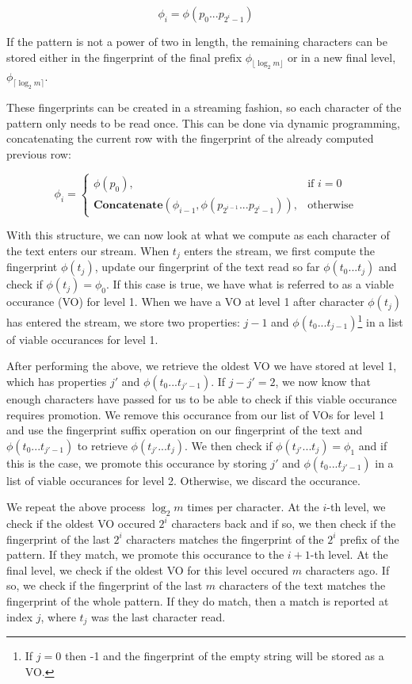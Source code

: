 \documentclass[ %
                    author={Dominic Joseph Moylett},
                supervisor={Dr. Raphael Clifford and Dr. Benjamin Sach},
                    degree={MEng},
                     title={Dictionary Matching with Fingerprints},
                  subtitle={An Empirical Analysis},
                      type={Research},
                      year={2014} ]{dissertation}
\begin{document}
$$\phi_i = \phi(p_0...p_{2^i-1})$$

If the pattern is not a power of two in length, the remaining characters can be stored either in the fingerprint of the final prefix $\phi_{\lfloor\log_2m\rfloor}$ or in a new final level, $\phi_{\lceil\log_2m\rceil}$.

These fingerprints can be created in a streaming fashion, so each character of the pattern only needs to be read once. This can be done via dynamic programming, concatenating the current row with the fingerprint of the already computed previous row:

\[
  \phi_i =
  \begin{cases}
    \phi(p_0),& \text{if } i = 0\\
    \textbf{Concatenate}(\phi_{i - 1}, \phi(p_{2^{i-1}}...p_{2^i-1})),& \text{otherwise}
  \end{cases}
\]

With this structure, we can now look at what we compute as each character of the text enters our stream. When $t_j$ enters the stream, we first compute the fingerprint $\phi(t_j)$, update our fingerprint of the text read so far $\phi(t_0...t_j)$ and check if $\phi(t_j) = \phi_0$. If this case is true, we have what is referred to as a viable occurance (VO) for level 1. When we have a VO at level 1 after character $\phi(t_j)$ has entered the stream, we store two properties: $j-1$ and $\phi(t_0...t_{j-1})$\footnote{If $j = 0$ then -1 and the fingerprint of the empty string will be stored as a VO.} in a list of viable occurances for level 1.

After performing the above, we retrieve the oldest VO we have stored at level 1, which has properties $j'$ and $\phi(t_0...t_{j'-1})$. If $j - j' = 2$, we now know that enough characters have passed for us to be able to check if this viable occurance requires promotion. We remove this occurance from our list of VOs for level 1 and use the fingerprint suffix operation on our fingerprint of the text and $\phi(t_0...t_{j'-1})$ to retrieve $\phi(t_{j'}...t_j)$. We then check if $\phi(t_{j'}...t_j) = \phi_1$ and if this is the case, we promote this occurance by storing $j'$ and $\phi(t_0...t_{j'-1})$ in a list of viable occurances for level 2. Otherwise, we discard the occurance.

We repeat the above process $\log_2m$ times per character. At the $i$-th level, we check if the oldest VO occured $2^i$ characters back and if so, we then check if the fingerprint of the last $2^i$ characters matches the fingerprint of the $2^i$ prefix of the pattern. If they match, we promote this occurance to the $i+1$-th level. At the final level, we check if the oldest VO for this level occured $m$ characters ago. If so, we check if the fingerprint of the last $m$ characters of the text matches the fingerprint of the whole pattern. If they do match, then a match is reported at index $j$, where $t_j$ was the last character read.
\end{document}
